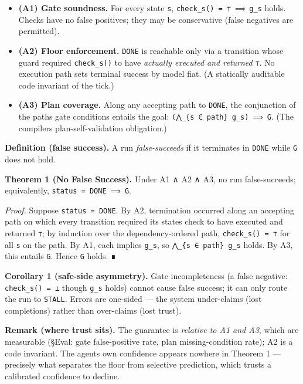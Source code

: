 \begin{itemize}
\tightlist
\item
  \textbf{(A1) Gate soundness.} For every state \texttt{s}, \texttt{check\_s()\ =\ ⊤\ ⟹\ g\_s} holds. Checks have no false
  positives; they may be conservative (false negatives are permitted).
\item
  \textbf{(A2) Floor enforcement.} \texttt{DONE} is reachable only via a transition whose guard required
  \texttt{check\_s()} to have \emph{actually executed and returned} \texttt{⊤}. No execution path sets terminal success by
  model fiat. (A statically auditable code invariant of the tick.)
\item
  \textbf{(A3) Plan coverage.} Along any accepting path to \texttt{DONE}, the conjunction of the path\textquotesingle s gate
  conditions entails the goal: \texttt{(⋀\_\{s\ ∈\ path\}\ g\_s)\ ⟹\ G}. (The compiler\textquotesingle s plan-self-validation obligation.)
\end{itemize}

\textbf{Definition (false success).} A run \emph{false-succeeds} if it terminates in \texttt{DONE} while \texttt{G} does not hold.

\textbf{Theorem 1 (No False Success).} Under A1 ∧ A2 ∧ A3, no run false-succeeds; equivalently,
\texttt{status\ =\ DONE\ ⟹\ G}.

\emph{Proof.} Suppose \texttt{status\ =\ DONE}. By A2, termination occurred along an accepting path on which every
transition required its state\textquotesingle s check to have executed and returned \texttt{⊤}; by induction over the
dependency-ordered path, \texttt{check\_s()\ =\ ⊤} for all \texttt{s} on the path. By A1, each implies \texttt{g\_s}, so
\texttt{⋀\_\{s\ ∈\ path\}\ g\_s} holds. By A3, this entails \texttt{G}. Hence \texttt{G} holds. ∎

\textbf{Corollary 1 (safe-side asymmetry).} Gate incompleteness (a false negative: \texttt{check\_s()\ =\ ⊥} though
\texttt{g\_s} holds) cannot cause false success; it can only route the run to \texttt{STALL}. Errors are one-sided ---
the system under-claims (lost completions) rather than over-claims (lost trust).

\textbf{Remark (where trust sits).} The guarantee is \emph{relative to A1 and A3}, which are measurable
(§Eval: gate false-positive rate, plan missing-condition rate); A2 is a code invariant. The agent\textquotesingle s
own confidence appears nowhere in Theorem 1 --- precisely what separates the floor from selective
prediction, which trusts a calibrated confidence to decline.



